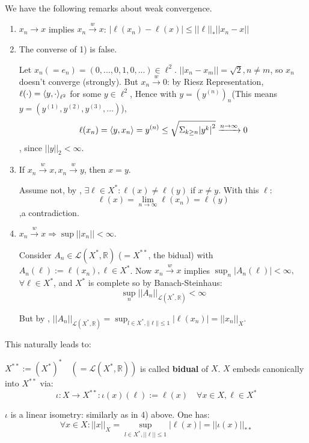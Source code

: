 \documentclass{article}
\begin{document}
\begin{remark}
\label{properties of weak convergence}
We have the following remarks about weak convergence.  

\begin{enumerate}[1)]
    \item $x_n\rightarrow x$ implies  $x_n \xrightarrow{w} x$: $|\ell(x_n) - \ell(x)| \leq ||\ell||_* ||x_n - x||$
    
    \item The converse of 1) is false.   
    
    Let $x_n (= e_n) = (0,...,0,1,0,...) \in \ell^2$. $||x_n-x_m|| = \sqrt{2}, n\neq m$, so $x_n$ doesn't converge (strongly). But $x_n \xrightarrow{w} 0$: by Riesz Representation, $\ell(\cdot) = \left<{y},{\cdot}\right>_{\ell^2}$ for some $y \in \ell^2$, Hence with $y=(y^{(n)})_n$(This means $y=(y^{(1)}, y^{(2)}, y^{(3)}, \ldots)$),
    $$
    \ell(x_n) = \left<{y},{x_n}\right> = y^{(n)} \leq \sqrt{\Sigma_{k\geq n} {|y^k|}^2} \xrightarrow{n\rightarrow \infty} 0
    $$, since $||y||_2 < \infty$.
    
    \item If $x_n \xrightarrow{w} x, x_n \xrightarrow{w} y$, then $x=y$.   
    
    Assume not, by , $\exists \ell \in X^*: \ell(x) \neq \ell(y)$ if $x\neq y$. With this $\ell$: $$\ell(x) = \lim_{n \to \infty} \ell(x_n) = \ell(y) $$ 
    ,a contradiction.
    
    \item $x_n \xrightarrow{w} x \Rightarrow \sup||x_n|| < \infty$.   
    
    Consider $A_n \in \mathcal{L}(X^*, \mathbb{R})$ ($=X^{**}$, the bidual) with $A_n(\ell) := \ell(x_n), \ell \in X^*$. Now $x_n \xrightarrow{w} x$ implies $\sup_n |A_n(\ell)| < \infty,$ $\forall \ell\in X^*$, and $X^*$ is complete so by Banach-Steinhaus: $$\sup_n ||A_n||_{\mathcal{L}(X^*, \mathbb{R})} < \infty$$ 
    
    But by ,  $||A_n||_{\mathcal{L}(X^*,\mathbb{R})} = \sup_{l\in X^*, ||\ell||\leq 1} |\ell(x_n)| = ||x_n||_X$.
\end{enumerate}
\end{remark}

This naturally leads to:

\begin{definition}[Bidual]
\label{bidual defnition}
    $X^{**} := (X^*)^* \quad (=\mathcal{L}(X^*,\mathbb{R}))$ is called \textbf{bidual} of $X$. $X$ embeds canonically into $X^{**}$ via: $$ \iota : X\rightarrow X^{**}: \iota(x)(\ell) := \ell(x) \quad \forall x \in X, \ell \in X^*$$ 
\end{definition}
\begin{remark}
    $\iota$ is a linear isometry: similarly as in  4) above. One has: $$\forall x \in X: ||x||_X = \sup_{l\in X^*, ||\ell|| \leq 1} |\ell(x)| = ||\iota(x)||_{**}$$
\end{remark}
\end{document}
